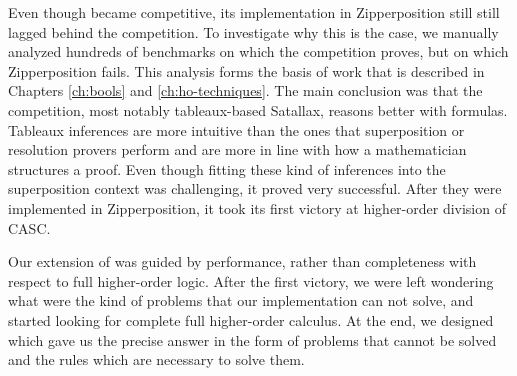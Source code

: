 Even though \lfsup{} became competitive, its implementation in Zipperposition
still still lagged behind the competition. To investigate why this is the case,
we manually analyzed hundreds of benchmarks on which the competition proves, but
on which Zipperposition fails. This analysis forms the basis of work that is
described in Chapters \ref{ch:bools} and \ref{ch:ho-techniques}. The main
conclusion was that the competition, most notably tableaux-based Satallax,
reasons better with formulas. Tableaux inferences are more intuitive than the
ones that superposition or resolution provers perform and are more in line with
how a mathematician structures a proof. Even though fitting these kind of
inferences into the superposition context was challenging, it proved very
successful. After they were implemented in Zipperposition, it took its first
victory at higher-order division of CASC.

Our extension of \lfsup{} was guided by performance, rather than completeness
with respect to full higher-order logic. After the first victory, we were left
wondering what were the kind of problems that our implementation can not
solve, and started looking for complete full higher-order calculus. At the end,
we designed \osup{} which gave us the precise answer in the form of problems that
cannot be solved and the rules which are necessary to solve them. 
